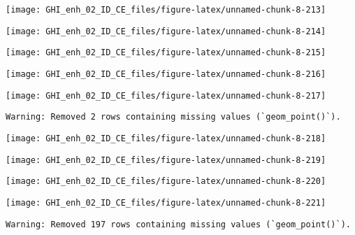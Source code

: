 \documentclass[
  10pt,
  a4paper,oneside]{article}
\begin{document}
\begin{center}\texttt{[image: GHI\_enh\_02\_ID\_CE\_files/figure-latex/unnamed-chunk-8-213]} \end{center}

\begin{center}\texttt{[image: GHI\_enh\_02\_ID\_CE\_files/figure-latex/unnamed-chunk-8-214]} \end{center}

\begin{center}\texttt{[image: GHI\_enh\_02\_ID\_CE\_files/figure-latex/unnamed-chunk-8-215]} \end{center}

\begin{center}\texttt{[image: GHI\_enh\_02\_ID\_CE\_files/figure-latex/unnamed-chunk-8-216]} \end{center}

\begin{center}\texttt{[image: GHI\_enh\_02\_ID\_CE\_files/figure-latex/unnamed-chunk-8-217]} \end{center}

\begin{verbatim}
Warning: Removed 2 rows containing missing values (`geom_point()`).
\end{verbatim}

\begin{center}\texttt{[image: GHI\_enh\_02\_ID\_CE\_files/figure-latex/unnamed-chunk-8-218]} \end{center}

\begin{center}\texttt{[image: GHI\_enh\_02\_ID\_CE\_files/figure-latex/unnamed-chunk-8-219]} \end{center}

\begin{center}\texttt{[image: GHI\_enh\_02\_ID\_CE\_files/figure-latex/unnamed-chunk-8-220]} \end{center}

\begin{center}\texttt{[image: GHI\_enh\_02\_ID\_CE\_files/figure-latex/unnamed-chunk-8-221]} \end{center}

\begin{verbatim}
Warning: Removed 197 rows containing missing values (`geom_point()`).
\end{verbatim}
\end{document}
